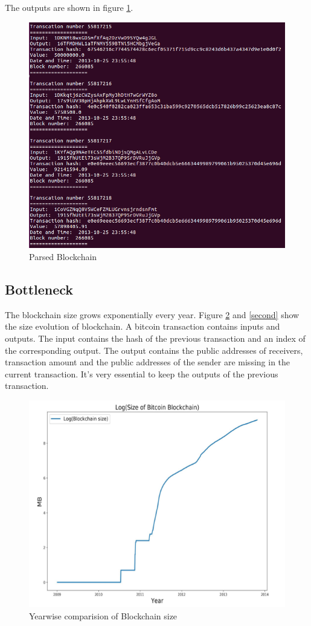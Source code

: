 \documentclass[runningheads,a4paper]{llncs}[2017/09/04]
\begin{document}
The outputs are shown in figure \ref{parse}.

\begin{figure}[!htb]
	\centering 
	\includegraphics[width=0.8\columnwidth]{parse} 
	\caption{Parsed Blockchain} %
	\label{parse}
\end{figure}

\subsection{Bottleneck}

The blockchain size grows exponentially every year. Figure \ref{first} and \ref{second} show the size evolution of blockchain.
A bitcoin transaction contains inputs and outputs.
The input contains the hash of the previous transaction and an index of the corresponding output.
The output contains the public addresses of receivers, transaction amount and the public addresses of the sender are missing in the current transaction.
It's very essential to keep the outputs of the previous transaction.


\begin{figure}[!htb]
	\centering 
	\includegraphics[width=0.8\columnwidth]{1} 
	\caption{Yearwise comparision of Blockchain size} %
	\label{first}
\end{figure}
\end{document}
